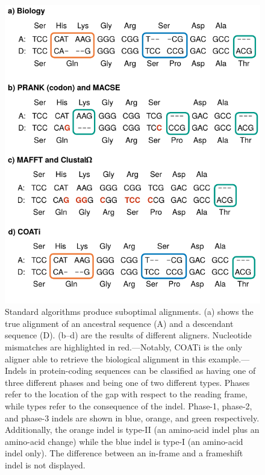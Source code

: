 \documentclass[12pt,letterpaper]{article}
\begin{document}
\begin{figure}[h!]
    \centering%
    \includegraphics[scale=1]{figures/fig-aln.pdf}
    \par
    \caption{
        Standard algorithms produce suboptimal alignments.
        (a) shows the true alignment of an ancestral sequence (A) and a descendant sequence (D).
        (b--d) are the results of different aligners. Nucleotide mismatches are highlighted in red.---Notably, COATi is the only aligner able to retrieve the biological alignment in this example.---%
        Indels in protein-coding sequences can be classified as having one of three different phases and being one of two different types.
        Phases refer to the location of the gap with respect to the reading frame, while types refer to the consequence of the indel.
        Phase-1, phase-2, and phase-3 indels are shown in blue, orange, and green respectively.
        Additionally, the orange indel is type-II (an amino-acid indel plus an amino-acid change) while the blue indel is type-I (an amino-acid indel only). The difference between an in-frame and a frameshift indel is not displayed.
        }
    \label{fig:aln}
\end{figure}
\end{document}
